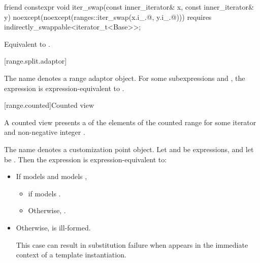 %
\begin{itemdecl}
friend constexpr void iter_swap(const inner_iterator& x, const inner_iterator& y)
  noexcept(noexcept(ranges::iter_swap(x.i_.@, y.i_.@)))
  requires indirectly_swappable<iterator_t<Base>>;
\end{itemdecl}

\begin{itemdescr}
\pnum
\effects Equivalent to
.
\end{itemdescr}

[range.split.adaptor]{}

\pnum
The name  denotes a
range adaptor object.
For some subexpressions  and ,
the expression  is expression-equivalent to
.


[range.counted]{Counted view}

\pnum
A counted view presents a  of the elements
of the counted range 
for some iterator  and non-negative integer .

\pnum
The name  denotes a
customization point object.
Let  and  be expressions,
and let  be .
Then the expression  is expression-equivalent to:

\begin{itemize}
\item If  models  and
   models ,
  \begin{itemize}
  \item {}
    if  models .
  \item Otherwise,
    .
\end{itemize}

\item Otherwise,  is ill-formed.
  \begin{note}
  This case can result in substitution failure when 
  appears in the immediate context of a template instantiation.
  \end{note}
\end{itemize}

